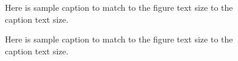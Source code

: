 \documentclass[aps,prb,twocolumn,superscriptaddress,amsmath]{revtex4-2}
\begin{document}
%


\begin{figure}[h]
    \centering
    
    \caption{Here is sample caption to match to the figure text size to the caption text size.}
\end{figure}


\newpage

\begin{figure}
    \centering
    
    \caption{Here is sample caption to match to the figure text size to the caption text size.}
\end{figure}
\end{document}
